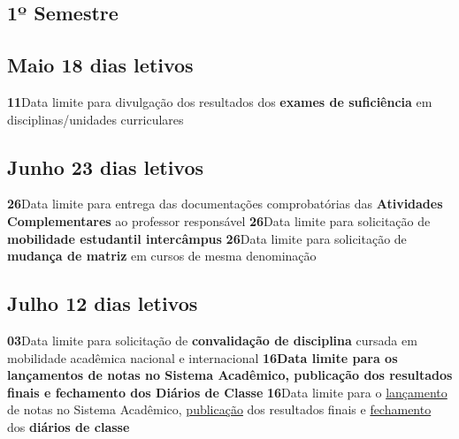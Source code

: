 \documentclass[thesis]{hmcposter}
\begin{document}
\begin{poster}
\section{\hfill \color{hmcorange}1º Semestre}
\subsection{Maio \hfill 18 dias letivos}\textbf{11}\qquad Data limite para divulgação dos resultados dos \textbf{exames de suficiência} em disciplinas/unidades curriculares \newline \null\subsection{Junho \hfill 23 dias letivos}\textbf{26}\qquad Data limite para entrega das documentações comprobatórias das \textbf{Atividades Complementares} ao professor responsável \newline \null\textbf{26}\qquad Data limite para solicitação de \textbf{mobilidade estudantil intercâmpus} \newline \null\textbf{26}\qquad Data limite para solicitação de \textbf{mudança de matriz} em cursos de mesma denominação \newline \null\subsection{Julho \hfill 12 dias letivos}\textbf{03}\qquad Data limite para solicitação de \textbf{convalidação de disciplina} cursada em mobilidade acadêmica nacional e internacional \newline \null\textbf{16}\qquad \textbf{Data limite para os lançamentos de notas no Sistema Acadêmico, publicação dos resultados finais e fechamento dos Diários de Classe} \newline \null\textbf{16}\qquad Data limite para o \underline{lançamento} de notas no Sistema Acadêmico, \underline{publicação} dos resultados finais e \underline{fechamento} dos \textbf{diários de classe} \newline \null\newpage

\end{poster}
\end{document}
